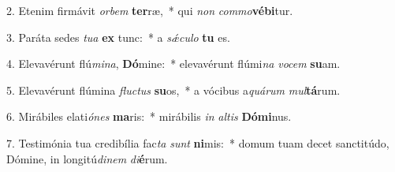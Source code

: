 2. Etenim firmávit \textit{or}\textit{bem} \textbf{ter}ræ,~*  qui \textit{non} \textit{com}\textit{mo}\textbf{vé}\textbf{bi}tur.\

3. Paráta sedes \textit{tu}\textit{a} \textbf{ex} tunc:~*  a \textit{sǽ}\textit{cu}\textit{lo} \textbf{tu} es.\

4. Elevavérunt flú\textit{mi}\textit{na}, \textbf{Dó}mine:~*  elevavérunt flúmi\textit{na} \textit{vo}\textit{cem} \textbf{su}am.\

5. Elevavérunt flúmina \textit{fluc}\textit{tus} \textbf{su}os,~*  a vócibus a\textit{quá}\textit{rum} \textit{mul}\textbf{tá}rum.\

6. Mirábiles elati\textit{ó}\textit{nes} \textbf{ma}ris:~*  mirábilis \textit{in} \textit{al}\textit{tis} \textbf{Dó}\textbf{mi}nus.\

7. Testimónia tua credibília fac\textit{ta} \textit{sunt} \textbf{ni}mis:~*  domum tuam decet sanctitúdo, Dómine, in longitú\textit{di}\textit{nem} \textit{di}\textbf{é}rum.\

